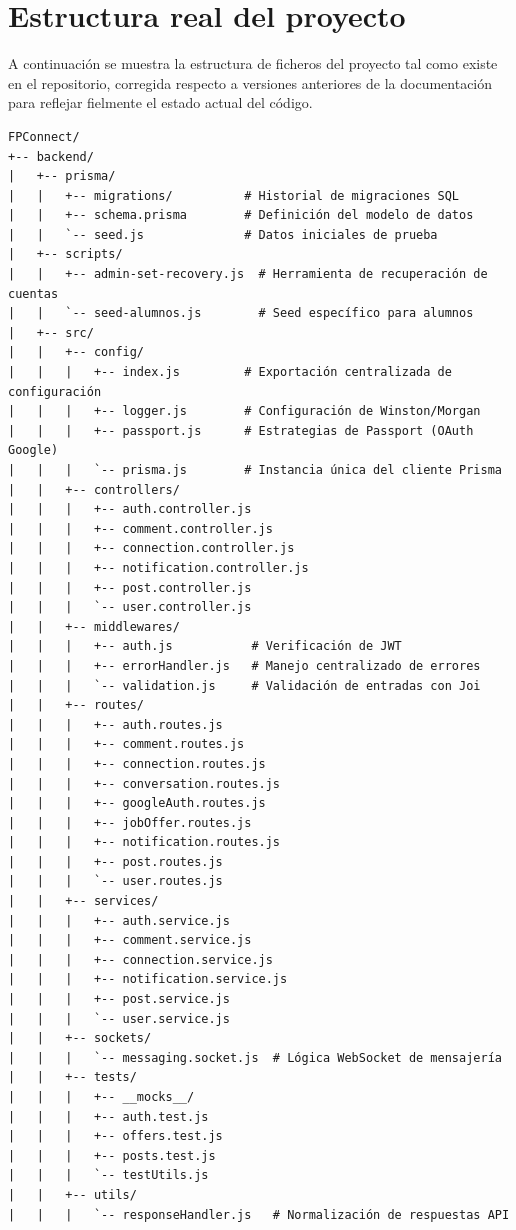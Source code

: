\documentclass[a4paper]{report}
\begin{document}
\section{Estructura real del proyecto}

A continuación se muestra la estructura de ficheros del proyecto tal como existe en el repositorio, corregida respecto a versiones anteriores de la documentación para reflejar fielmente el estado actual del código.

\begin{verbatim}
FPConnect/
+-- backend/
|   +-- prisma/
|   |   +-- migrations/          # Historial de migraciones SQL
|   |   +-- schema.prisma        # Definición del modelo de datos
|   |   `-- seed.js              # Datos iniciales de prueba
|   +-- scripts/
|   |   +-- admin-set-recovery.js  # Herramienta de recuperación de cuentas
|   |   `-- seed-alumnos.js        # Seed específico para alumnos
|   +-- src/
|   |   +-- config/
|   |   |   +-- index.js         # Exportación centralizada de configuración
|   |   |   +-- logger.js        # Configuración de Winston/Morgan
|   |   |   +-- passport.js      # Estrategias de Passport (OAuth Google)
|   |   |   `-- prisma.js        # Instancia única del cliente Prisma
|   |   +-- controllers/
|   |   |   +-- auth.controller.js
|   |   |   +-- comment.controller.js
|   |   |   +-- connection.controller.js
|   |   |   +-- notification.controller.js
|   |   |   +-- post.controller.js
|   |   |   `-- user.controller.js
|   |   +-- middlewares/
|   |   |   +-- auth.js           # Verificación de JWT
|   |   |   +-- errorHandler.js   # Manejo centralizado de errores
|   |   |   `-- validation.js     # Validación de entradas con Joi
|   |   +-- routes/
|   |   |   +-- auth.routes.js
|   |   |   +-- comment.routes.js
|   |   |   +-- connection.routes.js
|   |   |   +-- conversation.routes.js
|   |   |   +-- googleAuth.routes.js
|   |   |   +-- jobOffer.routes.js
|   |   |   +-- notification.routes.js
|   |   |   +-- post.routes.js
|   |   |   `-- user.routes.js
|   |   +-- services/
|   |   |   +-- auth.service.js
|   |   |   +-- comment.service.js
|   |   |   +-- connection.service.js
|   |   |   +-- notification.service.js
|   |   |   +-- post.service.js
|   |   |   `-- user.service.js
|   |   +-- sockets/
|   |   |   `-- messaging.socket.js  # Lógica WebSocket de mensajería
|   |   +-- tests/
|   |   |   +-- __mocks__/
|   |   |   +-- auth.test.js
|   |   |   +-- offers.test.js
|   |   |   +-- posts.test.js
|   |   |   `-- testUtils.js
|   |   +-- utils/
|   |   |   `-- responseHandler.js   # Normalización de respuestas API

\end{verbatim}
\end{document}
